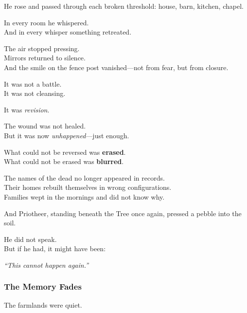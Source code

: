 \documentclass[12pt]{article}
\begin{document}
\vspace{0.5em}
He rose and passed through each broken threshold: house, barn, kitchen, chapel.

\vspace{0.5em}
In every room he whispered.\\
And in every whisper something retreated.

\vspace{0.5em}
The air stopped pressing.\\
Mirrors returned to silence.\\
And the smile on the fence post vanished---not from fear, but from closure.

\vspace{0.5em}
It was not a battle.\\
It was not cleansing.

\vspace{0.5em}
It was \textit{revision}.

\vspace{0.5em}
The wound was not healed.\\
But it was now \textit{unhappened}---just enough.

\vspace{0.5em}
What could not be reversed was \textbf{erased}.\\
What could not be erased was \textbf{blurred}.

\vspace{0.5em}
The names of the dead no longer appeared in records.\\
Their homes rebuilt themselves in wrong configurations.\\
Families wept in the mornings and did not know why.

\vspace{0.5em}
And Priotheer, standing beneath the Tree once again, pressed a pebble into the soil.

\vspace{0.5em}
He did not speak.\\
But if he had, it might have been:

\vspace{0.5em}
\textit{``This cannot happen again.''}


\dotfill

\subsubsection*{The Memory Fades}

The farmlands were quiet.
\end{document}
